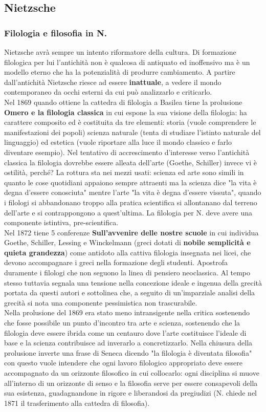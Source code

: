 \documentclass[10pt,a4paper]{article}
\begin{document}
\subsection{Nietzsche}
\subsubsection{Filologia e filosofia in N.}
 Nietzsche avrà sempre un intento riformatore della cultura. Di formazione filologica per lui l'antichità non è qualcosa di antiquato ed inoffensivo ma è un modello eterno che ha la potenzialità di produrre cambiamento. A partire dall'antichità Nietzsche riesce ad essere \textbf{inattuale}, a vedere il mondo contemporaneo da occhi esterni da cui può analizzarlo e criticarlo.\\
Nel 1869 quando ottiene la cattedra di filologia a Basilea tiene la prolusione \textbf{Omero e la filologia classica} in cui espone la sua visione della filologia: ha carattere composito ed è costituita da tre elementi: storia (vuole comprendere le manifestazioni dei popoli) scienza naturale (tenta di studiare l'istinto naturale del linguaggio) ed estetica (vuole riportare alla luce il mondo classico e farlo diventare esempio). Nel tentativo di accrescimento d'interesse verso l'antichità classica la filologia dovrebbe essere alleata dell'arte (Goethe, Schiller) invece vi è ostilità, perché? La rottura sta nei mezzi usati: scienza ed arte sono simili in quanto le cose quotidiani appaiono sempre attraenti ma la scienza dice "la vita è degna d'essere conosciuta" mentre l'arte "la vita è degna d'essere vissuta", quando i filologi si abbandonano troppo alla pratica scientifica si allontanano dal terreno dell'arte e si contrappongono a quest'ultima. La filologia per N. deve avere una componente istintiva, pre-scientifica.\\
Nel 1872 tiene 5 conferenze \textbf{Sull'avvenire delle nostre scuole} in cui individua Goethe, Schiller, Lessing e Winckelmann (greci dotati di \textbf{nobile semplicità e quieta grandezza}) come antidoto alla cattiva filologia insegnata nei licei, che devono accompagnare i greci nella formazione degli studenti. Apostrofa duramente i filologi che non seguono la linea di pensiero neoclassica. Al tempo stesso tuttavia segnala una tensione nella concezione ideale e ingenua della grecità portata da questi autori e sottolinea che, a seguito di un'imparziale analisi della grecità si nota una componente pessimistica non trascurabile.\\
Nella prolusione del 1869 era stato meno intransigente nella critica sostenendo che fosse possibile un punto d'incontro tra arte e scienza, sostenendo che la filologia deve essere ibrida come un centauro dove l'arte costituisce l'ideale di base e la scienza contribuisce ad inverarlo a concretizzarlo. Nella chiusura della prolusione inverte una frase di Seneca dicendo "la filologia è diventata filosofia" con questo vuole intendere che ogni lavoro filologico appropriato deve essere accompagnato da un orizzonte filosofico in cui collocarlo: ogni disciplina si muove all'interno di un orizzonte di senso e la filosofia serve per essere consapevoli della sua esistenza, guadagnandone in rigore e liberandosi da pregiudizi (N. chiede nel 1871 il trasferimento alla cattedra di filosofia).\\
\end{document}
